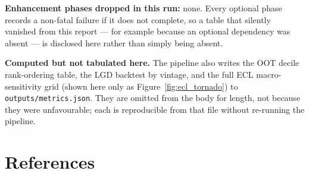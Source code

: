 \documentclass[11pt,a4paper]{article}
\begin{document}
\noindent\textbf{Enhancement phases dropped in this run:} none. Every optional phase records a non-fatal failure if it does not complete, so a table that silently vanished from this report --- for example because an optional dependency was absent --- is disclosed here rather than simply being absent.

\vspace{0.6em}
\noindent\textbf{Computed but not tabulated here.} The pipeline also writes the OOT decile rank-ordering table, the LGD backtest by vintage, and the full ECL macro-sensitivity grid (shown here only as Figure~\ref{fig:ecl_tornado}) to \texttt{outputs/metrics.json}. They are omitted from the body for length, not because they were unfavourable; each is reproducible from that file without re-running the pipeline.


\clearpage
\section*{References}
\printbibliography[heading=none]
\end{document}
